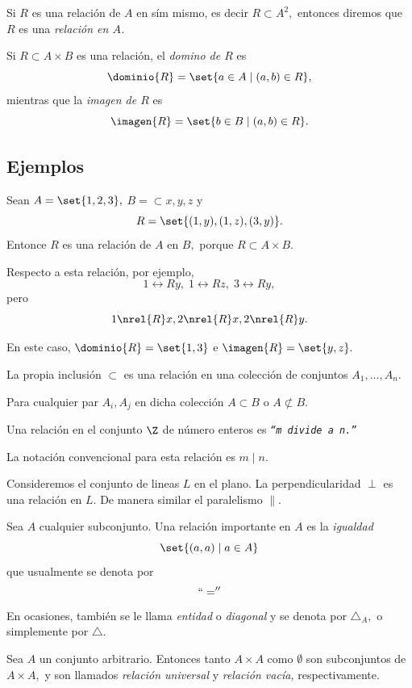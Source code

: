 	Si $R$ es una relación de $A$ en sím mismo, es decir $R \subset A^{2},$ entonces diremos que $R$ es una \emph{relación en $A$.}



	\begin{defn}
		Si $R \subset A \times B$ es una relación, el \emph{domino de $R$} es 
		$$
		\dominio{R}=\set{a\in A\mid (a,b)\in R},
		$$ mientras que la \emph{imagen de $R$} es 
		$$
		\imagen{R}=\set{b\in B\mid (a,b)\in R}.
		$$
	\end{defn}
	


\subsection{Ejemplos}

	Sean $A=\set{1,2,3},$ $B=\subset{x,y,z}$ y $$R=\set{(1,y), (1,z), (3,y)}.$$ Entonce $R$ es una relación de $A$ en $B,$ porque $R \subset A \times B.$
	
	
	Respecto a esta relación, por ejemplo,
	$$
	1\rel{R}y, \; 1\rel{R}z, \; 3\rel{R}y,
	$$ pero 
	$$
	1\nrel{R}x, 2\nrel{R}x, 2\nrel{R}y.
	$$
	
	
	En este caso, $\dominio{R}=\set{1,3}$ e $\imagen{R}=\set{y,z}.$



	La propia inclusión $\subset$ es una relación en una colección de conjuntos $A_{1},...,A_{n}.$ 
	
	Para cualquier par $A_{i}, A_{j}$ en dicha colección $A \subset B$ o $A \not\subset B.$



	Una relación en el conjunto $\Z$ de número enteros es \emph{\texttt{``$m$ divide a $n.$''}}
	
	
	La notación convencional para esta relación es \emph{$m \mid n.$}



	Consideremos el conjunto de lineas $L$ en el plano. La perpendicularidad $\perp$ es una relación en $L.$  De manera similar el paralelismo $\parallel.$



	Sea $A$ cualquier subconjunto. Una relación importante en $A$ es la \emph{igualdad}
	$$
	\set{(a,a) \mid a \in A}
	$$ que usualmente se denota por \emph{$$``=''$$} 
	 En ocasiones, tambi\'en se le llama \emph{entidad} o \emph{diagonal} y se denota por $\triangle_{A},$ o simplemente por $\triangle.$



	Sea $A$ un conjunto arbitrario. Entonces tanto $A\times A$ como $\emptyset$ son subconjuntos de $A \times A,$ y son llamados \emph{relación universal} y \emph{relación vacía,} respectivamente.



